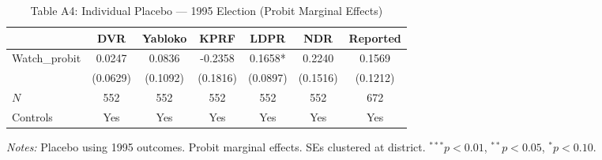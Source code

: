 \begin{table}[htbp]
\centering
\caption{Table A4: Individual Placebo --- 1995 Election (Probit Marginal Effects)}
\label{tab:enik_tableA4}
\begin{adjustbox}{max width=\textwidth}
\begin{tabular}{lcccccc}
\toprule
 & DVR & Yabloko & KPRF & LDPR & NDR & Reported \\
\midrule
Watch\_probit & 0.0247 & 0.0836 & -0.2358 & 0.1658* & 0.2240 & 0.1569 \\
 & (0.0629) & (0.1092) & (0.1816) & (0.0897) & (0.1516) & (0.1212) \\
$N$ & 552 & 552 & 552 & 552 & 552 & 672 \\
\midrule
Controls & Yes & Yes & Yes & Yes & Yes & Yes \\
\bottomrule
\end{tabular}
\end{adjustbox}
\parbox{\textwidth}{\footnotesize\textit{Notes:} Placebo using 1995 outcomes. Probit marginal effects. SEs clustered at district. $^{***}p<0.01$, $^{**}p<0.05$, $^{*}p<0.10$.}
\end{table}